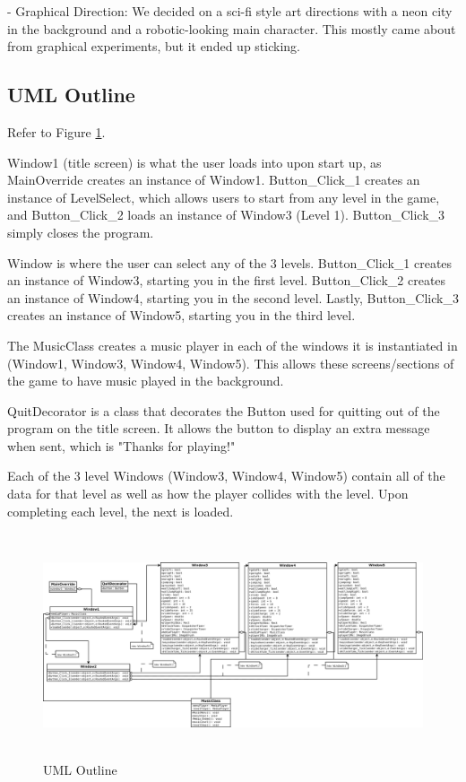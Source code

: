 \documentclass[10pt,conference,onecolumn,compsoc]{IEEEtran}
\begin{document}
- Graphical Direction: We decided on a sci-fi style art directions with a neon city in the background and a robotic-looking main character. This mostly came about from graphical experiments, but it ended up sticking.

\subsection{UML Outline}
Refer to Figure \ref{Facade}.

Window1 (title screen) is what the user loads into upon start up, as MainOverride creates an instance of Window1. Button\_Click\_1 creates an instance of LevelSelect, which allows users to start from any level in the game, and Button\_Click\_2 loads an instance of Window3 (Level 1). Button\_Click\_3 simply closes the program.

Window is where the user can select any of the 3 levels. Button\_Click\_1 creates an instance of Window3, starting you in the first level. Button\_Click\_2 creates an instance of Window4, starting you in the second level. Lastly, Button\_Click\_3 creates an instance of Window5, starting you in the third level.

The MusicClass creates a music player in each of the windows it is instantiated in (Window1, Window3, Window4, Window5). This allows these screens/sections of the game to have music played in the background.

QuitDecorator is a class that decorates the Button used for quitting out of the program on the title screen. It allows the button to display an extra message when sent, which is "Thanks for playing!"

Each of the 3 level Windows (Window3, Window4, Window5) contain all of the data for that level as well as how the player collides with the level. Upon completing each level, the next is loaded.
\begin{figure}[ht!]
\includegraphics[height=250px, width=500px]{elyzium_uml.png}
\caption{UML Outline}
\label{Facade}
\end{figure}
\end{document}
